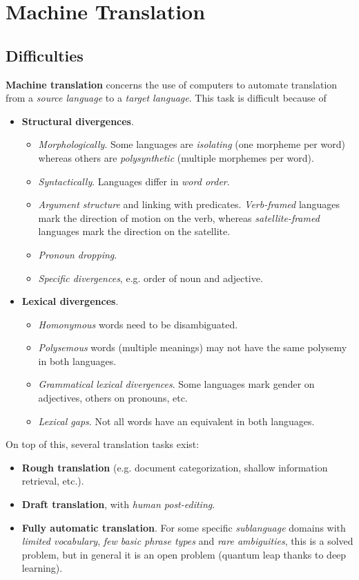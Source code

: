 \section{Machine Translation}
\subsection{Difficulties}
\textbf{Machine translation} concerns the use of computers to automate translation from a \emph{source language} to a \emph{target language}.
This task is difficult because of
\begin{itemize}
	\item \textbf{Structural divergences}.
	\begin{itemize}
		\item \emph{Morphologically}.
		Some languages are \emph{isolating} (one morpheme per word) whereas others are \emph{polysynthetic} (multiple morphemes per word).
		\item \emph{Syntactically}.
		Languages differ in \emph{word order}.
		\item \emph{Argument structure} and linking with predicates.
		\emph{Verb-framed} languages mark the direction of motion on the verb, whereas \emph{satellite-framed} languages mark the direction on the satellite.
		\item \emph{Pronoun dropping}.
		\item \emph{Specific divergences}, e.g. order of noun and adjective.
	\end{itemize}
	\item \textbf{Lexical divergences}.
	\begin{itemize}
		\item \emph{Homonymous} words need to be disambiguated.
		\item \emph{Polysemous} words (multiple meanings) may not have the same polysemy in both languages.
		\item \emph{Grammatical lexical divergences}.
		Some languages mark gender on adjectives, others on pronouns, etc.
		\item \emph{Lexical gaps}.
		Not all words have an equivalent in both languages.
	\end{itemize}
\end{itemize}

On top of this, several translation tasks exist:
\begin{itemize}
	\item \textbf{Rough translation} (e.g. document categorization, shallow information retrieval, etc.).
	\item \textbf{Draft translation}, with \emph{human post-editing}.
	\item \textbf{Fully automatic translation}.
	For some specific \emph{sublanguage} domains with \emph{limited vocabulary}, \emph{few basic phrase types} and \emph{rare ambiguities}, this is a solved problem, but in general it is an open problem (quantum leap thanks to deep learning).
\end{itemize}

